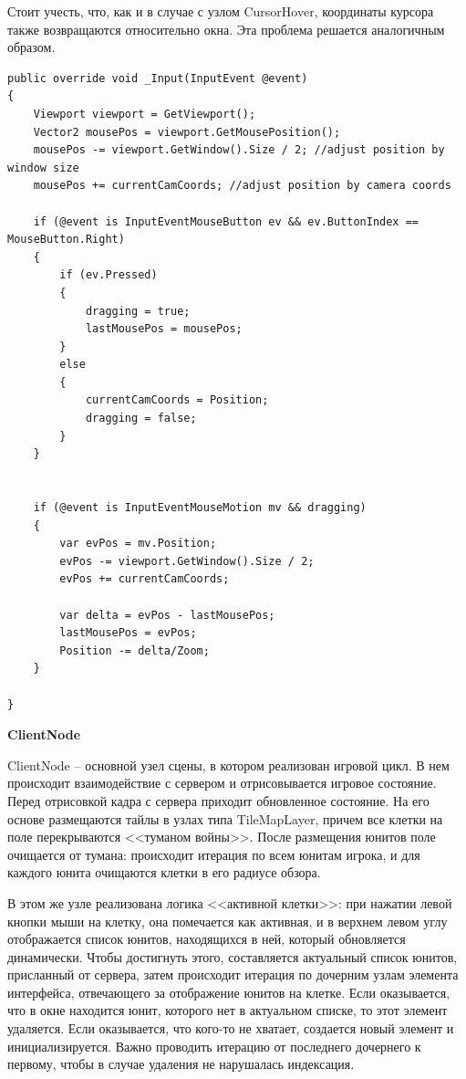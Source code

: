             Стоит учесть, что, как и в случае с узлом CursorHover, координаты курсора также возвращаются относительно окна. Эта проблема решается аналогичным образом.

            \begin{lstlisting}[caption=Реализация перемещения камеры]
public override void _Input(InputEvent @event)
{
    Viewport viewport = GetViewport();
    Vector2 mousePos = viewport.GetMousePosition();
    mousePos -= viewport.GetWindow().Size / 2; //adjust position by window size
    mousePos += currentCamCoords; //adjust position by camera coords

    if (@event is InputEventMouseButton ev && ev.ButtonIndex == MouseButton.Right)
    {
        if (ev.Pressed)
        {
            dragging = true;
            lastMousePos = mousePos;
        }
        else
        {
            currentCamCoords = Position;
            dragging = false;
        }
    }


    if (@event is InputEventMouseMotion mv && dragging)
    {
        var evPos = mv.Position;
        evPos -= viewport.GetWindow().Size / 2;
        evPos += currentCamCoords;

        var delta = evPos - lastMousePos;
        lastMousePos = evPos;
        Position -= delta/Zoom;
    }

}
            \end{lstlisting}

            \textbf{ClientNode}

            ClientNode -- основной узел сцены, в котором реализован игровой цикл. В нем происходит взаимодействие с сервером и отрисовывается игровое состояние. Перед отрисовкой кадра с сервера приходит обновленное состояние. На его основе размещаются тайлы в узлах типа TileMapLayer, причем все клетки на поле перекрываются <<туманом войны>>. После размещения юнитов поле очищается от тумана: происходит итерация по всем юнитам игрока, и для каждого юнита очищаются клетки в его радиусе обзора.
            
            В этом же узле реализована логика <<активной клетки>>: при нажатии левой кнопки мыши на клетку, она помечается как активная, и в верхнем левом углу отображается список юнитов, находящихся в ней, который обновляется динамически. Чтобы достигнуть этого, составляется актуальный список юнитов, присланный от сервера, затем происходит итерация по дочерним узлам элемента интерфейса, отвечающего за отображение юнитов на клетке. Если оказывается, что в окне находится юнит, которого нет в актуальном списке, то этот элемент удаляется. Если оказывается, что кого-то не хватает, создается новый элемент и инициализируется. Важно проводить итерацию от последнего дочернего к первому, чтобы в случае удаления не нарушалась индексация.
            
